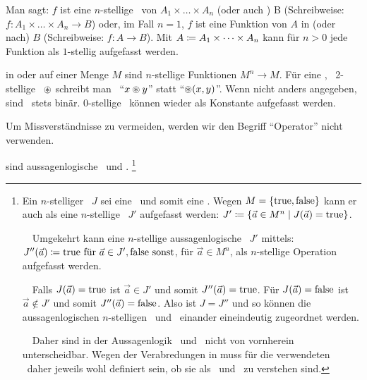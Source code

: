 \begin{description}
	Man sagt: $f$ ist eine $n$-stellige \Funktion\ von $A_1 \times \dots \times A_n$  (oder auch ) B (Schreibweise: $f : A_1 \times \dots \times A_n \rightarrow B$) oder, im Fall $n=1$, $f$ ist eine Funktion von $A$ in (oder nach) $B$ (Schreibweise: $f : A \rightarrow B$). Mit $A \coloneqq A_1 \times \dots \times A_n$ kann für $n > 0$ jede Funktion als $1$-stellig aufgefasst werden.

	\item [\Operationen] in oder auf einer Menge $M$ sind $n$-stellige Funktionen $M^n \rightarrow M$.
	Für eine , \textdh\ 2-stellige \Operation\ $\mathbin{\circledast}$ schreibt man \textiAlg\ \enquote{$x \mathbin{\circledast} y$} statt \enquote{$\mathbin{\circledast}(x,y)$}.
	Wenn nicht anders angegeben, sind \Operationen\ stets binär.
	0-stellige \Operationen\ können wieder als Konstante aufgefasst werden.

	Um Missverständnisse zu vermeiden, werden wir den Begriff \enquote{Operator} nicht verwenden.

	\item [\Junktoren] sind aussagenlogische \Relationen\ und \Operationen.%
	\footnote{\label{def:Junktor}%
		Ein $n$-stelliger \Junktor\ $J$ sei eine \Operation\ und somit eine \Funktion.
		Wegen $M = \{\mathrm{true},\mathrm{false}\}$ kann er auch als eine $n$-stellige \Relation\ $J'$ aufgefasst werden:
		$J' \coloneqq \{\vec{a} \in M^n \mid J(\vec{a}) = \mathrm{true}\}$.

		~~Umgekehrt kann eine $n$-stellige aussagenlogische \Relation\ $J'$ mittels:
		$J''(\vec{a}) \coloneqq \mathrm{true} \text{ für } \vec{a} \in J', \mathrm{false} \text{ sonst}$, für $\vec{a} \in M^n$, als $n$-stellige Operation aufgefasst werden.

		~~Falls $J(\vec{a})=\mathrm{true}$ ist $\vec{a} \in J'$ und somit $J''(\vec{a})=\mathrm{true}$.
		Für $J(\vec{a})=\mathrm{false}$ ist $\vec{a} \notin J'$ und somit $J''(\vec{a})=\mathrm{false}$.
		Also ist $J=J''$ und so können die aussagenlogischen $n$-stelligen \Relationen\ und \Operationen\ einander eineindeutig zugeordnet werden.

		~~Daher sind in der Aussagenlogik \Relationen\ und \Operationen\ nicht von vornherein unterscheidbar.
		Wegen der Verabredungen in  muss für die verwendeten \Junktoren\ daher jeweils wohl definiert sein, ob sie als \Relation\ und \Operation\ zu verstehen sind.
	}
\end{description}

